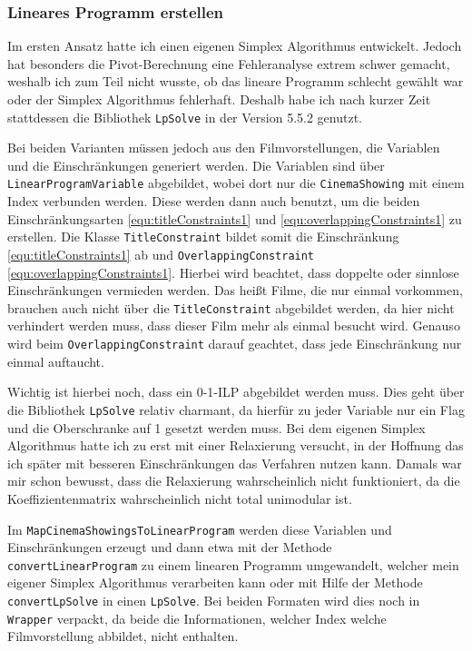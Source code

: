 \documentclass[a4paper, 12pt]{article}
\begin{document}
\subsubsection{Lineares Programm erstellen}

Im ersten Ansatz hatte ich einen eigenen Simplex Algorithmus entwickelt.
Jedoch hat besonders die Pivot-Berechnung eine Fehleranalyse extrem schwer gemacht, weshalb ich zum Teil nicht wusste, ob das lineare Programm schlecht gewählt war oder der Simplex Algorithmus fehlerhaft.
Deshalb habe ich nach kurzer Zeit stattdessen die Bibliothek \texttt{LpSolve} in der Version 5.5.2 genutzt.

Bei beiden Varianten müssen jedoch aus den Filmvorstellungen, die Variablen und die Einschränkungen generiert werden.
Die Variablen sind über \texttt{LinearProgramVariable} abgebildet, wobei dort nur die \texttt{CinemaShowing} mit einem Index verbunden werden.
Diese werden dann auch benutzt, um die beiden Einschränkungsarten \eqref{equ:titleConstraints1} und \eqref{equ:overlappingConstraints1} zu erstellen.
Die Klasse \linebreak \texttt{TitleConstraint} bildet somit die Einschränkung \eqref{equ:titleConstraints1} ab und \linebreak \texttt{OverlappingConstraint} \eqref{equ:overlappingConstraints1}.
Hierbei wird beachtet, dass doppelte oder sinnlose Einschränkungen vermieden werden.
Das heißt Filme, die nur einmal vorkommen, brauchen auch nicht über die \texttt{TitleConstraint} abgebildet werden, da hier nicht verhindert werden muss, dass dieser Film mehr als einmal besucht wird.
Genauso wird beim \texttt{OverlappingConstraint} darauf geachtet, dass jede Einschränkung nur einmal auftaucht.

Wichtig ist hierbei noch, dass ein 0-1-ILP abgebildet werden muss.
Dies geht über die Bibliothek \texttt{LpSolve} relativ charmant, da hierfür zu jeder Variable nur ein Flag und die Oberschranke auf 1 gesetzt werden muss.
Bei dem eigenen Simplex Algorithmus hatte ich zu erst mit einer Relaxierung versucht, in der Hoffnung das ich später mit besseren Einschränkungen das Verfahren nutzen kann.
Damals war mir schon bewusst, dass die Relaxierung wahrscheinlich nicht funktioniert, da die Koeffizientenmatrix wahrscheinlich nicht total unimodular ist.  

Im \texttt{MapCinemaShowingsToLinearProgram} werden diese Variablen und Einschränkungen erzeugt und dann etwa mit der Methode \linebreak \texttt{convertLinearProgram} zu einem linearen Programm umgewandelt, welcher mein eigener Simplex Algorithmus verarbeiten kann oder mit Hilfe der Methode \texttt{convertLpSolve} in einen \texttt{LpSolve}.
Bei beiden Formaten wird dies noch in \texttt{Wrapper} verpackt, da beide die Informationen, welcher Index welche Filmvorstellung abbildet, nicht enthalten.
\end{document}
